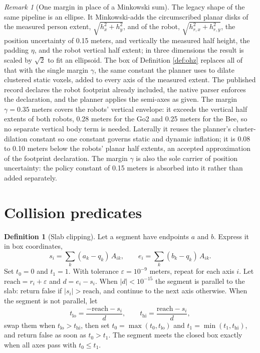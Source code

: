 \documentclass[10pt,a4paper]{article}
\theoremstyle{plain}
\theoremstyle{definition}
\newtheorem{definition}{Definition}[section]
\theoremstyle{remark}
\newtheorem{remark}{Remark}[section]
\begin{document}
\begin{remark}[One margin in place of a Minkowski sum]\label{rem:minkowski}
The legacy shape of the same pipeline is an ellipse. It Minkowski-adds the circumscribed planar disks of the measured person extent, $\sqrt{h_x^2 + h_y^2}$, and of the robot, $\sqrt{h_{r,x}^2 + h_{r,y}^2}$, the position uncertainty of 0.15 meters, and vertically the measured half height, the padding $\eta$, and the robot vertical half extent; in three dimensions the result is scaled by $\sqrt{2}$ to fit an ellipsoid. The box of Definition \ref{def:ohz} replaces all of that with the single margin $\gamma$, the same constant the planner uses to dilate clustered static voxels, added to every axis of the measured extent. The published record declares the robot footprint already included, the native parser enforces the declaration, and the planner applies the semi-axes as given. The margin $\gamma = 0.35$ meters covers the robots' vertical envelope: it exceeds the vertical half extents of both robots, 0.28 meters for the Go2 and 0.25 meters for the Bee, so no separate vertical body term is needed. Laterally it reuses the planner's cluster-dilation constant so one constant governs static and dynamic inflation; it is 0.08 to 0.10 meters below the robots' planar half extents, an accepted approximation of the footprint declaration. The margin $\gamma$ is also the sole carrier of position uncertainty: the policy constant of 0.15 meters is absorbed into it rather than added separately.
\end{remark}

\section{Collision predicates}

\begin{definition}[Slab clipping]\label{def:slab}
Let a segment have endpoints $a$ and $b$. Express it in box coordinates,
\begin{equation}
s_i = \sum_k (a_k - q_k)\,A_{ik}, \qquad e_i = \sum_k (b_k - q_k)\,A_{ik}.
\end{equation}
Set $t_0 = 0$ and $t_1 = 1$. With tolerance $\varepsilon = 10^{-9}$ meters, repeat for each axis $i$. Let $\mathrm{reach} = r_i + \varepsilon$ and $d = e_i - s_i$. When $|d| < 10^{-15}$ the segment is parallel to the slab: return false if $|s_i| > \mathrm{reach}$, and continue to the next axis otherwise. When the segment is not parallel, let
\begin{equation}
t_{\mathrm{lo}} = \frac{-\mathrm{reach} - s_i}{d}, \qquad t_{\mathrm{hi}} = \frac{\mathrm{reach} - s_i}{d},
\end{equation}
swap them when $t_{\mathrm{lo}} > t_{\mathrm{hi}}$, then set $t_0 = \max(t_0, t_{\mathrm{lo}})$ and $t_1 = \min(t_1, t_{\mathrm{hi}})$, and return false as soon as $t_0 > t_1$. The segment meets the closed box exactly when all axes pass with $t_0 \le t_1$.
\end{definition}
\end{document}
